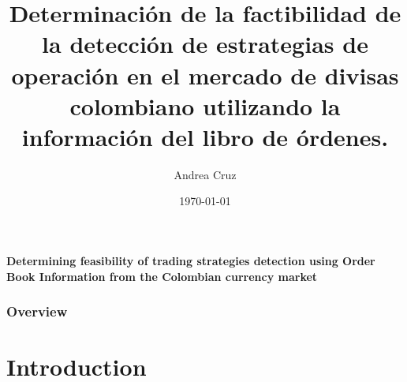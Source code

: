\documentclass{beamer}
\title[Detection of trading strategies]{Determinaci\'{o}n de la factibilidad de la detecci\'{o}n de estrategias de operaci\'{o}n en el mercado de divisas colombiano utilizando la informaci\'{o}n del libro de \'{o}rdenes.} %
\author{Andrea Cruz} %
\institute[UN] %
{
Universidad Nacional de Colombia\\ %
\medskip
\textit{amcruzm@unal.edu.co}\\ %
\medskip
\medskip
Advisor: German Hernandez\\
Universidad Nacional de Colombia\\ 
\textit{gjhernandezl@unal.edu.co}
}
\date{\today} %
\begin{document}
\begin{frame}
\titlepage %
\end{frame}

\begin{frame}
\centering
\textbf{\color[rgb]{0,0,1} \LARGE Determining feasibility of trading strategies detection using Order Book Information from the Colombian currency market}

\end{frame}

\begin{frame}
\frametitle{Overview} %
\tableofcontents %
\end{frame}

\section{Introduction}
\end{document}
